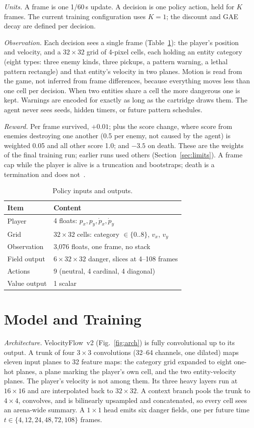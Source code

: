 \documentclass[journal]{IEEEtran}
\begin{document}
\emph{Units.} A frame is one 1/60\,s update. A decision is one policy action,
held for $K$ frames. The current training configuration uses $K=1$; the
discount and GAE decay are defined per decision.

\emph{Observation.} Each decision sees a single frame (Table~\ref{tab:io}):
the player's position and velocity, and a $32\times32$ grid of 4-pixel cells,
each holding an entity category (eight types: three enemy kinds, three
pickups, a pattern warning, a lethal pattern rectangle) and that entity's
velocity in two planes. Motion is read from the game, not inferred from frame
differences, because everything moves less than one cell per decision. When
two entities share a cell the more dangerous one is kept. Warnings are encoded
for exactly as long as the cartridge draws them. The agent never sees seeds,
hidden timers, or future pattern schedules.

\emph{Reward.} Per frame survived, $+0.01$; plus the score change, where score
from enemies destroying one another (0.5 per enemy, not caused by the agent)
is weighted 0.05 and all other score 1.0; and $-3.5$ on death. These are the
weights of the final training run; earlier runs used others
(Section~\ref{sec:limits}). A frame cap
while the player is alive is a truncation and bootstraps; death is a
termination and does not~\cite{pardo}.

\begin{table}[t]
\caption{Policy inputs and outputs.}
\label{tab:io}
\centering
\begin{tabular}{@{}ll@{}}
\toprule
Item & Content \\
\midrule
Player & 4 floats: $p_x, p_y, \dot p_x, \dot p_y$ \\
Grid & $32\times32$ cells: category $\in\{0..8\}$, $v_x$, $v_y$ \\
Observation & 3,076 floats, one frame, no stack \\
Field output & $6\times32\times32$ danger, slices at 4--108 frames \\
Actions & 9 (neutral, 4 cardinal, 4 diagonal) \\
Value output & 1 scalar \\
\bottomrule
\end{tabular}
\end{table}

\section{Model and Training}\label{sec:model}
\emph{Architecture.} VelocityFlow~v2 (Fig.~\ref{fig:arch}) is fully
convolutional up to its output. A trunk of four $3\times3$ convolutions
(32--64 channels, one dilated) maps eleven input planes to 32 feature maps:
the category grid expanded to eight one-hot planes, a plane marking the
player's own cell, and the two entity-velocity planes. The player's
velocity is not among them. Its three heavy layers run at
$16\times16$ and are interpolated back to $32\times32$. A context branch pools
the trunk to $4\times4$, convolves, and is bilinearly upsampled and
concatenated, so every cell sees an arena-wide summary. A $1\times1$ head
emits six danger fields, one per future time
$t\in\{4,12,24,48,72,108\}$ frames.
\end{document}

